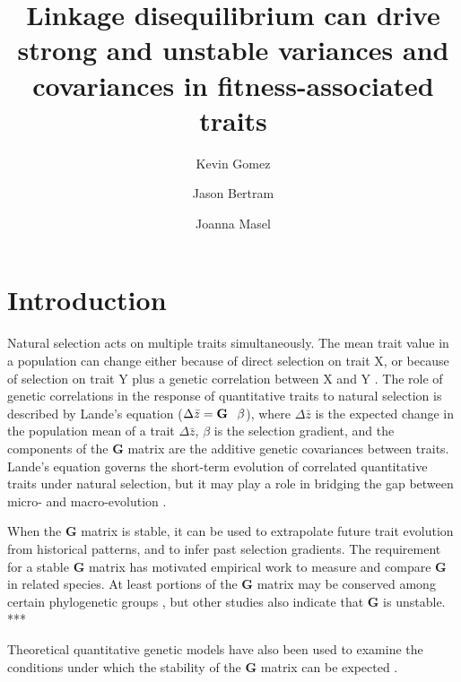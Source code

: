 \documentclass[9pt,twocolumn,twoside]{gsajnl}
\title{Linkage disequilibrium can drive strong and unstable variances and covariances in fitness-associated traits}
\author[$\ast$,1]{Kevin Gomez}
\author[$\dagger$]{Jason Bertram}
\author[$\dagger$]{Joanna Masel}
\affil[$\ast$]{Graduate Interdisciplinary Program in Applied Mathematics, University of Arizona, and}
\affil[$\dagger$]{Department of Evolution and Ecology, University of Arizona}
\newcommand{\G}{\textbf{G }}
\begin{document}
\maketitle
\thispagestyle{firststyle}
\marginmark
\firstpagefootnote
{}
\vspace{-11pt}%

\section{Introduction}

Natural selection acts on multiple traits simultaneously. The mean trait value in a population can change either because of direct selection on trait X, or because of selection on trait Y plus a genetic correlation between X and Y \citep{lande1979quantitative,lande1983measurement}. The role of genetic correlations in the response of quantitative traits to natural selection is described by Lande's equation ($\Delta \bar{z} = \G \hspace{.05in}\beta$), where $\Delta \bar{z}$ is the expected change in the population mean of a trait $\Delta \bar{z}$, $\beta$ is the selection gradient, and the components of the \G  matrix are the additive genetic covariances between traits. Lande's equation governs the short-term evolution of correlated quantitative traits under natural selection, but it may play a role in bridging the gap between micro- and macro-evolution \citep{Arnold2001,Arnold2008,Schluter1996,Schluter2000}.\par

When the \G matrix is stable, it can be used to extrapolate future trait evolution from historical patterns, and to infer past selection gradients. The requirement for a stable \G matrix has motivated empirical work to measure and compare \G in related species. At least portions of the \G matrix may be conserved among certain phylogenetic groups \citep{Arnold1999,Roff2000,Steppan2002}, but other studies also indicate that \G is unstable. ***

Theoretical quantitative genetic models have also been used to examine the conditions under which the stability of the \G matrix can be expected \citep{Turelli1988}.  \par
% 
% 
\end{document}
